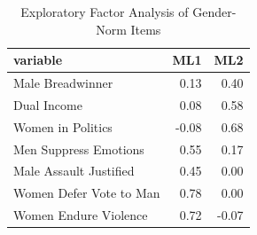 \begin{table}[!h]
\centering
\caption{Exploratory Factor Analysis of Gender-Norm Items}
\centering
\begin{tabular}[t]{lrr}
\toprule
variable & ML1 & ML2\\
\midrule
Male Breadwinner & 0.13 & 0.40\\
Dual Income & 0.08 & 0.58\\
Women in Politics & -0.08 & 0.68\\
Men Suppress Emotions & 0.55 & 0.17\\
Male Assault Justified & 0.45 & 0.00\\
Women Defer Vote to Man & 0.78 & 0.00\\
Women Endure Violence & 0.72 & -0.07\\
\bottomrule
\end{tabular}
\end{table}

